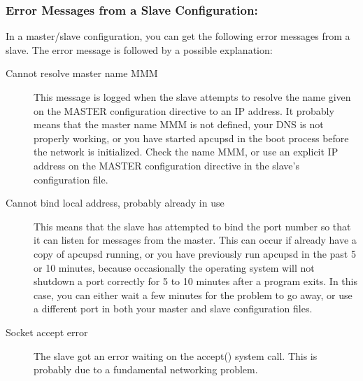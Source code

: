 {{{{{{\label{Error-Messages-from-a-Slave-Configuration}
\subsubsection*{Error Messages from a Slave Configuration:}

In a master/slave configuration, you can get the following error messages from
a slave. The error message is followed by a possible explanation: 

\begin{description}
\item[Cannot resolve master name MMM]
   \label{Cannot-resolve-master-name-MMM}
This message is logged when the slave attempts to resolve the name given on
the MASTER configuration directive to an IP address. It probably means that
the master name MMM is not defined, your DNS is not properly working, or you
have started apcupsd in the boot process before the network is initialized.
Check the name MMM, or use an explicit IP address on the MASTER configuration
directive in the slave's configuration file. 

\item[Cannot bind local address, probably already in use]
   \label{Cannot-bind-local-address_003b-probably-already-in-use}
This means that the slave has attempted to bind the port number so that it can
listen for messages from the master. This can occur if already have a copy of
apcupsd running, or you have previously run apcupsd in the past 5 or 10
minutes, because occasionally the operating system will not shutdown a port
correctly for 5 to 10 minutes after a program exits. In this case, you can
either wait a few minutes for the problem to go away, or use a different port
in both your master and slave configuration files. 

\item[Socket accept error]
   \label{Socket-accept-error}
The slave got an error waiting on the accept() system call. This is probably
due to a fundamental networking problem. 


\end{description}}}}}}}
